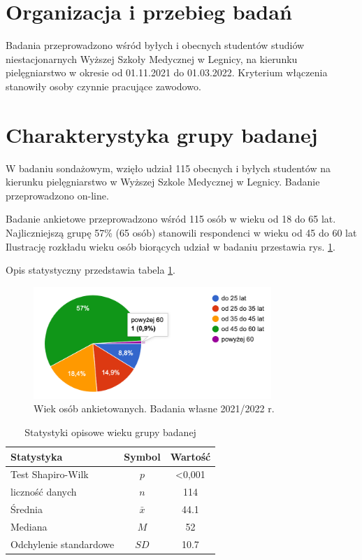 \documentclass[a4paper,12pt,twoside,openright]{mwrep}
\begin{document}
\section{Organizacja i przebieg badań}
Badania przeprowadzono wśród byłych i obecnych studentów studiów niestacjonarnych Wyższej Szkoły Medycznej w Legnicy, na kierunku pielęgniarstwo w okresie od 01.11.2021 do 01.03.2022. Kryterium włączenia stanowiły osoby czynnie pracujące zawodowo. 


\section{Charakterystyka grupy badanej}


W badaniu sondażowym, wzięło udział 115 obecnych i byłych studentów na kierunku pielęgniarstwo w Wyższej Szkole Medycznej w Legnicy. Badanie przeprowadzono on-line.



Badanie ankietowe przeprowadzono wśród 115 osób w wieku od 18 do 65 lat. Najliczniejszą grupę 57\%  (65 osób) stanowili respondenci w wieku od 45 do 60 lat 
Ilustrację rozkładu wieku osób biorących udział w badaniu przestawia rys. \ref{rys:wiek}.

Opis statystyczny przedstawia tabela \ref{tab:wiek}.



\begin{figure}[H]
\centering
\includegraphics[width=9cm]{char_gr_bad/wiek00}
\caption{Wiek osób ankietowanych. Badania własne 2021/2022 r.}
\label{rys:wiek}
\end{figure}


\begin {table}[H]
\caption{Statystyki opisowe wieku grupy badanej}
\centering
\begin{tabular}{|l|c|c|}
\hline
Statystyka & Symbol & Wartość\\
\hline
Test Shapiro-Wilk & $p$ & <0,001\\
\hline
liczność danych & $n$ & 114\\
\hline
Średnia & $\bar{x}$ & 44.1\\
\hline
Mediana & $M$ & 52\\
\hline
Odchylenie standardowe & $SD$ & 10.7\\
\hline

\end{tabular}
\label{tab:wiek}
\end{table}
\end{document}
